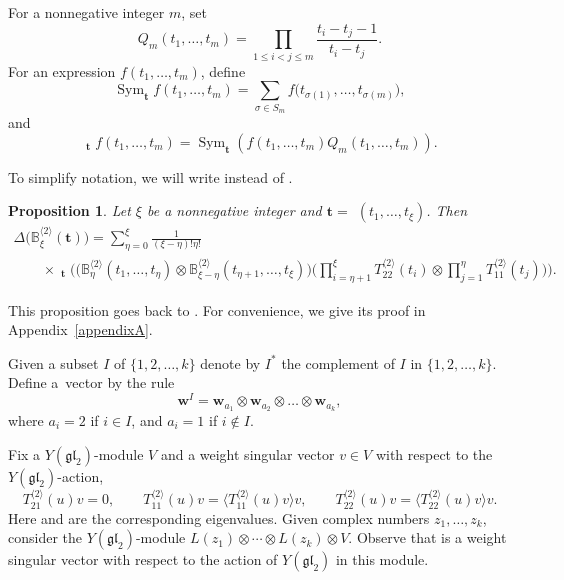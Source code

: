 \documentclass[10pt,a4paper]{amsart}
\numberwithin{equation}{section}
\newtheorem{Proposition}[Theorem]{Proposition}
 { \theoremstyle{definition}
\newtheorem{Definition}[Theorem]{Definition}
\newtheorem*{Example}{Example}
\newtheorem*{Remark}{Remark} }
\DeclareMathOperator{\Sym}{Sym }
\DeclareMathOperator{\Symb}{\overline{Sym} }
\newcommand\ltwo{\langle 2\rangle}
\begin{document}
For a nonnegative integer $m$, set
\begin{equation}\label{Qfun}
Q_{m} (t_{1}, \dots, t_{m} )=\prod_{1 \leqslant i<j \leqslant m} \frac{t_{i}-t_{j}-1}{t_{i}-t_{j}}.
\end{equation}
For an expression $f (t_{1},\dots,t_m )$, define
\begin{equation*}
\Sym_{\boldsymbol{t}} f (t_{1}, \dots, t_m )=\sum_{\sigma\in S_m} f \bigl(t_{\sigma(1)}, \dots, t_{\sigma(m)} \bigr),
\end{equation*}
and
\begin{equation}\label{barsym}
\Symb_{\boldsymbol{t}} f(t_{1}, \dots, t_m)=
\Sym_{\boldsymbol{t}} (f(t_{1}, \dots, t_m) Q_m (t_{1}, \dots, t_m ) ).
\end{equation}

To simplify notation, we will write \smash{$T^{\ltwo}_{ij}$} instead of \smash{$\bigl(T^{\ltwo}\bigr)^i_j$}.

\begin{Proposition}\label{twotensor}
Let $\xi$ be a nonnegative integer and $\boldsymbol{t}=$ $(t_{1}, \dots, t_{\xi} )$. Then
\begin{gather*}
\Delta \bigl( \mathbb{B}^{\ltwo}_{\xi}(\boldsymbol{t}) \bigr)=
\sum_{\eta=0}^{\xi} \frac{1}{(\xi-\eta) ! \eta!}\\
\qquad\times
\Symb_{\boldsymbol{t}}\Biggl( \bigl(\mathbb{B}^{\ltwo}_{\eta}(t_1,\dots,t_\eta) \otimes \mathbb{B}^{\ltwo}_{\xi-\eta}(t_{\eta+1},\dots,t_{\xi}) \bigr)
 \Biggl(\prod_{i=\eta+1}^{\xi } T^{\ltwo}_{22}(t_{i})\otimes \prod_{j=1}^{\eta} T^{\ltwo}_{11}(t_j)\Biggr) \Biggr).
\end{gather*}
\end{Proposition}
This proposition goes back to \cite{Kor,TV}. For convenience, we give its proof in Appendix~\ref{appendixA}.

Given a subset $I $ of $ \{1,2,\dots, k\}$ denote by $I^*$ the complement of $I$ in $\{1,2,\dots,k\}$. Define a~vector  by the rule{\samepage
\begin{equation*} \mathbf{w}^{I}=\mathbf{w}_{a_1}\otimes \mathbf{w}_{a_2}\otimes\dots\otimes \mathbf{w}_{a_k},\end{equation*}
where $a_i=2$ if $i\in I$, and $a_i=1$ if $i\not\in I$.}

Fix a $Y(\mathfrak{g l}_{2})$-module $V$ and a weight singular vector $v \in V$ with respect to the $Y(\mathfrak{g l}_{2})$-action,
\begin{equation*}
T^{\ltwo}_{21}(u)v=0, \qquad T^{\ltwo}_{11}(u)v=\bigl\langle T^{\ltwo}_{11}(u)v \bigr\rangle v,\qquad T^{\ltwo}_{22}(u)v=\bigl\langle T^{\ltwo}_{22}(u)v \bigr\rangle v.
\end{equation*}
Here \smash{$\bigl\langle T^{\ltwo}_{11}(u)v \bigr\rangle$} and \smash{$\bigl\langle T^{\ltwo}_{22}(u)v \bigr\rangle$} are the corresponding eigenvalues.
Given complex numbers $z_1,\dots,z_k$, consider the $Y(\mathfrak{g l}_{2})$-module $L(z_1) \otimes \cdots \otimes L(z_k) \otimes V $. Observe that  is a weight singular vector with respect to the action of $Y(\mathfrak{g l}_{2})$ in this module.
\end{document}
